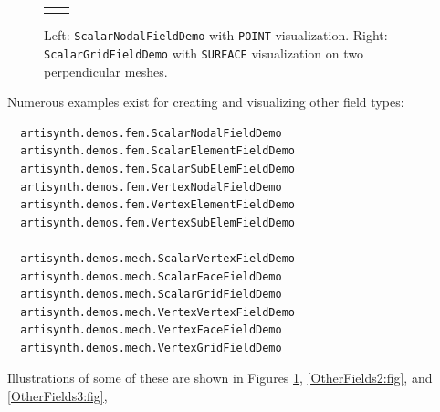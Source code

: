 \begin{figure}[h]
\begin{center}
\begin{tabular}{cc}
\fi
\end{tabular}
\end{center}
\caption{Left: {\tt ScalarNodalFieldDemo} with {\tt POINT} visualization.
Right: {\tt ScalarGridFieldDemo} with {\tt SURFACE} visualization on
two perpendicular meshes.}
\label{OtherFields1:fig}
\end{figure}

Numerous examples exist for creating and visualizing other field types:
%
\begin{verbatim}
  artisynth.demos.fem.ScalarNodalFieldDemo  
  artisynth.demos.fem.ScalarElementFieldDemo  
  artisynth.demos.fem.ScalarSubElemFieldDemo
  artisynth.demos.fem.VertexNodalFieldDemo  
  artisynth.demos.fem.VertexElementFieldDemo  
  artisynth.demos.fem.VertexSubElemFieldDemo

  artisynth.demos.mech.ScalarVertexFieldDemo
  artisynth.demos.mech.ScalarFaceFieldDemo
  artisynth.demos.mech.ScalarGridFieldDemo
  artisynth.demos.mech.VertexVertexFieldDemo
  artisynth.demos.mech.VertexFaceFieldDemo
  artisynth.demos.mech.VertexGridFieldDemo
\end{verbatim}

Illustrations of some of these are shown in
Figures \ref{OtherFields1:fig}, \ref{OtherFields2:fig},
and \ref{OtherFields3:fig},

